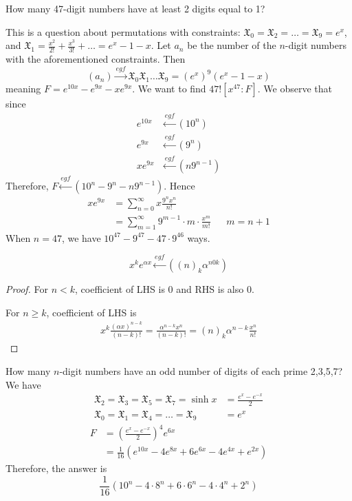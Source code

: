 \documentclass[12pt]{article}
\begin{document}
\eg How many 47-digit  numbers have at least 2 digits equal to 1?

This is a question about permutations with constraints: $\mathfrak{X}_0=\mathfrak{X}_2=\dots=\mathfrak{X}_9 = e^x$, and $\mathfrak{X}_1=\frac{x^2}{2!}+\frac{x^3}{3!}+\dots= e^x-1-x$. Let $a_n$ be the number of the $n$-digit numbers with the aforementioned constraints. Then $$(a_n)\xrightarrow{egf}\mathfrak{X}_{0}\mathfrak{X}_{1}\dots \mathfrak{X}_{9} = (e^x)^9 (e^x-1-x)$$
meaning $F=e^{10x}-e^{9x}-xe^{9x}$. We want to find $47![x^{47}:F]$. We observe that since \begin{align*}
    e^{10x} &\xleftarrow{egf} (10^n)\\
    e^{9x} &\xleftarrow{egf} (9^n)\\
    xe^{9x} &\xleftarrow{egf} (n9^{n-1})
\end{align*}
Therefore, $F\xleftarrow{egf}(10^n-9^n-n9^{n-1})$.
Hence \begin{align*}
    xe^{9x} &= \sum_{n=0}^{\infty}x\frac{9^nx^n}{n!}\\
    &= \sum_{m=1}^{\infty}9^{m-1}\cdot m \cdot \frac{x^m}{m!} &&m=n+1
\end{align*}
When $n=47$, we have $10^{47}-9^{47}-47\cdot 9^{46}$ ways.

\begin{lemma}
    \[x^ke^{\alpha x} \xleftarrow{egf} \left((n)_k\alpha^{n0k}\right)\]
\end{lemma}

\begin{proof}
    For $n<k$, coefficient of LHS is 0 and RHS is also 0.

    For $n\geq k$, coefficient of LHS is \begin{align*}
        x^k\frac{(\alpha x)^{n-k}}{(n-k)!} =\frac{\alpha^{n-k}x^n}{(n-k)!} = (n)_k\alpha^{n-k}\frac{x^n}{n!}
    \end{align*}
\end{proof}

\eg How many $n$-digit numbers have an odd number of digits of each prime 2,3,5,7?
We have \begin{align*}
    \mathfrak{X}_{2}=\mathfrak{X}_{3}=\mathfrak{X}_{5}=\mathfrak{X}_{7} = \sinh x&=\frac{e^x-e^{-x}}{2}\\
    \mathfrak{X}_0=\mathfrak{X}_{1}=\mathfrak{X}_{4}=\dots=\mathfrak{X}_{9} &=e^x
\end{align*}
\begin{align*}
    F&= \left(\frac{e^x-e^{-x}}{2}\right)^4e^{6x}\\
    &= \frac{1}{16}\left(e^{10x}-4e^{8x}+6e^{6x}-4e^{4x}+e^{2x}\right)
\end{align*}
Therefore, the answer is \[\frac{1}{16}\left(10^n-4\cdot 8^n+6\cdot 6^n-4\cdot 4^n + 2^n\right)\]
\end{document}
